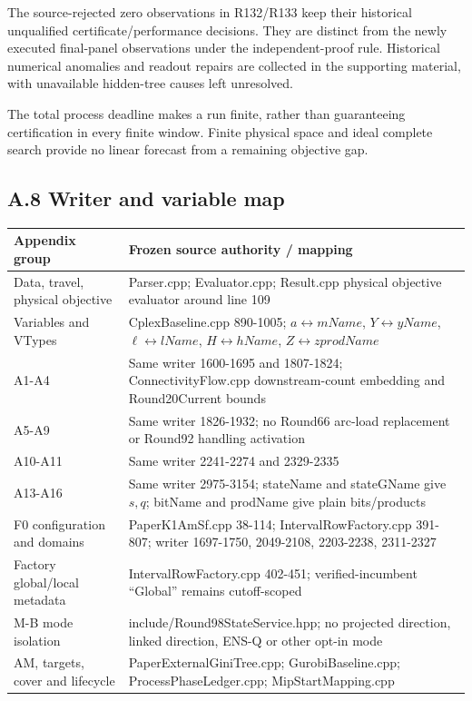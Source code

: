 \documentclass[
  american,
  11pt,
]{article}
\newcounter{none} %
\begin{document}
The source-rejected zero observations in R132/R133 keep their historical
unqualified certificate/performance decisions. They are distinct from
the newly executed final-panel observations under the independent-proof
rule. Historical numerical anomalies and readout repairs are collected
in the supporting material, with unavailable hidden-tree causes left
unresolved.

The total process deadline makes a run finite, rather than guaranteeing
certification in every finite window. Finite physical space and ideal
complete search provide no linear forecast from a remaining objective
gap.

\subsection{A.8 Writer and variable
map}\label{a.8-writer-and-variable-map}

{\def\LTcaptype{none} %
\begin{longtable}[]{@{}
  >{\raggedright\arraybackslash}p{}
  >{\raggedright\arraybackslash}p{}@{}}
\toprule\noalign{}
\begin{minipage}[b]{\linewidth}\raggedright
Appendix group
\end{minipage} & \begin{minipage}[b]{\linewidth}\raggedright
Frozen source authority / mapping
\end{minipage} \\
\midrule\noalign{}
\endhead
\bottomrule\noalign{}
\endlastfoot
Data, travel, physical objective & Parser.cpp; Evaluator.cpp; Result.cpp
physical objective evaluator around line 109 \\
Variables and VTypes & CplexBaseline.cpp 890-1005;
\(a\leftrightarrow mName\), \(Y\leftrightarrow yName\),
\(\ell\leftrightarrow lName\), \(H\leftrightarrow hName\),
\(Z\leftrightarrow zprodName\) \\
A1-A4 & Same writer 1600-1695 and 1807-1824; ConnectivityFlow.cpp
downstream-count embedding and Round20Current bounds \\
A5-A9 & Same writer 1826-1932; no Round66 arc-load replacement or
Round92 handling activation \\
A10-A11 & Same writer 2241-2274 and 2329-2335 \\
A13-A16 & Same writer 2975-3154; stateName and stateGName give \(s,q\);
bitName and prodName give plain bits/products \\
F0 configuration and domains & PaperK1AmSf.cpp 38-114;
IntervalRowFactory.cpp 391-807; writer 1697-1750, 2049-2108, 2203-2238,
2311-2327 \\
Factory global/local metadata & IntervalRowFactory.cpp 402-451;
verified-incumbent ``Global'' remains cutoff-scoped \\
M-B mode isolation & include/Round98StateService.hpp; no projected
direction, linked direction, ENS-Q or other opt-in mode \\
AM, targets, cover and lifecycle & PaperExternalGiniTree.cpp;
GurobiBaseline.cpp; ProcessPhaseLedger.cpp; MipStartMapping.cpp \\
\end{longtable}
}
\end{document}
